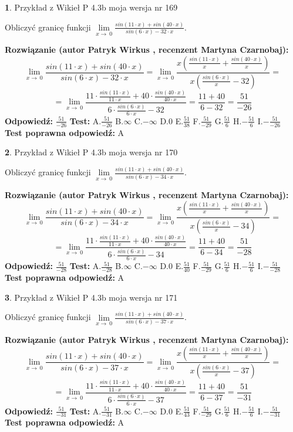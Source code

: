 \documentclass[12pt, a4paper]{article}
\theoremstyle{definition} %
\newtheorem{zad}{}
\newcommand{\zadStart}[1]{\begin{zad}#1\newline}
\newcommand{\zadStop}{\end{zad}}
\newcommand{\rozwStart}[2]{\noindent \textbf{Rozwiązanie (autor #1 , recenzent #2): }\newline}
\newcommand{\rozwStop}{\newline}
\newcommand{\odpStart}{\noindent \textbf{Odpowiedź:}\newline}
\newcommand{\odpStop}{\newline}
\newcommand{\testStart}{\noindent \textbf{Test:}\newline}
\newcommand{\testStop}{\newline}
\newcommand{\kluczStart}{\noindent \textbf{Test poprawna odpowiedź:}\newline}
\newcommand{\kluczStop}{\newline}
\begin{document}
\zadStart{Przykład z Wikieł P 4.3b moja wersja nr 169}


Obliczyć granicę funkcji $\lim\limits_{x\to\ 0}\frac{sin(11 \cdot x)+sin(40 \cdot x)}{sin(6 \cdot x)-32 \cdot x}$.
\zadStop
\rozwStart{Patryk Wirkus}{Martyna Czarnobaj}
$$\lim\limits_{x\to\ 0}\frac{sin(11 \cdot x)+sin(40 \cdot x)}{sin(6 \cdot x)-32 \cdot x}=\lim\limits_{x\to\ 0}\frac{x(\frac{sin(11 \cdot x)}{x}+\frac{sin(40 \cdot x)}{x})}{x(\frac{sin(6 \cdot x)}{x}-32)}=$$
$$=\lim\limits_{x\to\ 0}\frac{11 \cdot \frac{sin(11 \cdot x)}{11 \cdot x}+40 \cdot \frac{sin(40 \cdot x)}{40 \cdot x}}{6 \cdot \frac{sin(6 \cdot x)}{6 \cdot x}-32}=\frac{11+40}{6-32} = \frac{51}{-26}$$
\rozwStop
\odpStart
$\frac{51}{-26}$
\odpStop
\testStart
A.$\frac{51}{-26}$
B.$\infty$
C.$-\infty$
D.$0$
E.$\frac{51}{38}$
F.$\frac{51}{-29}$
G.$\frac{51}{6}$
H.$-\frac{51}{6}$
I.$-\frac{51}{-26}$
\testStop
\kluczStart
A
\kluczStop



\zadStart{Przykład z Wikieł P 4.3b moja wersja nr 170}


Obliczyć granicę funkcji $\lim\limits_{x\to\ 0}\frac{sin(11 \cdot x)+sin(40 \cdot x)}{sin(6 \cdot x)-34 \cdot x}$.
\zadStop
\rozwStart{Patryk Wirkus}{Martyna Czarnobaj}
$$\lim\limits_{x\to\ 0}\frac{sin(11 \cdot x)+sin(40 \cdot x)}{sin(6 \cdot x)-34 \cdot x}=\lim\limits_{x\to\ 0}\frac{x(\frac{sin(11 \cdot x)}{x}+\frac{sin(40 \cdot x)}{x})}{x(\frac{sin(6 \cdot x)}{x}-34)}=$$
$$=\lim\limits_{x\to\ 0}\frac{11 \cdot \frac{sin(11 \cdot x)}{11 \cdot x}+40 \cdot \frac{sin(40 \cdot x)}{40 \cdot x}}{6 \cdot \frac{sin(6 \cdot x)}{6 \cdot x}-34}=\frac{11+40}{6-34} = \frac{51}{-28}$$
\rozwStop
\odpStart
$\frac{51}{-28}$
\odpStop
\testStart
A.$\frac{51}{-28}$
B.$\infty$
C.$-\infty$
D.$0$
E.$\frac{51}{40}$
F.$\frac{51}{-29}$
G.$\frac{51}{6}$
H.$-\frac{51}{6}$
I.$-\frac{51}{-28}$
\testStop
\kluczStart
A
\kluczStop



\zadStart{Przykład z Wikieł P 4.3b moja wersja nr 171}


Obliczyć granicę funkcji $\lim\limits_{x\to\ 0}\frac{sin(11 \cdot x)+sin(40 \cdot x)}{sin(6 \cdot x)-37 \cdot x}$.
\zadStop
\rozwStart{Patryk Wirkus}{Martyna Czarnobaj}
$$\lim\limits_{x\to\ 0}\frac{sin(11 \cdot x)+sin(40 \cdot x)}{sin(6 \cdot x)-37 \cdot x}=\lim\limits_{x\to\ 0}\frac{x(\frac{sin(11 \cdot x)}{x}+\frac{sin(40 \cdot x)}{x})}{x(\frac{sin(6 \cdot x)}{x}-37)}=$$
$$=\lim\limits_{x\to\ 0}\frac{11 \cdot \frac{sin(11 \cdot x)}{11 \cdot x}+40 \cdot \frac{sin(40 \cdot x)}{40 \cdot x}}{6 \cdot \frac{sin(6 \cdot x)}{6 \cdot x}-37}=\frac{11+40}{6-37} = \frac{51}{-31}$$
\rozwStop
\odpStart
$\frac{51}{-31}$
\odpStop
\testStart
A.$\frac{51}{-31}$
B.$\infty$
C.$-\infty$
D.$0$
E.$\frac{51}{43}$
F.$\frac{51}{-29}$
G.$\frac{51}{6}$
H.$-\frac{51}{6}$
I.$-\frac{51}{-31}$
\testStop
\kluczStart
A
\kluczStop
\end{document}
